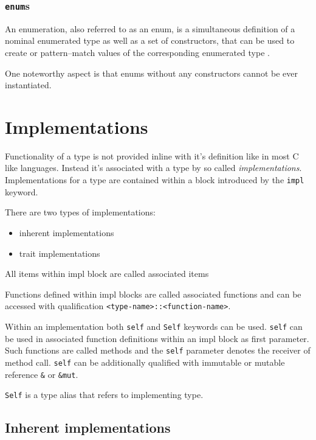 \subsubsection{\texttt{enum}s}

An enumeration, also referred to as an enum, is a simultaneous definition of a nominal enumerated type as well as a set of constructors, 
that can be used to create or pattern--match values of the corresponding enumerated type \cite{rustreference}.

One noteworthy aspect is that enums without any constructors cannot be ever instantiated.

\section{Implementations}

Functionality of a type is not provided inline with it's definition like in most C like languages. 
Instead it's associated with a type by so called \textit{implementations}.
Implementations for a type are contained within a block introduced by the \texttt{impl} keyword.

There are two types of implementations:
\begin{itemize}
    \item inherent implementations
    \item trait implementations
\end{itemize}

All items within impl block are called associated items

Functions defined within impl blocks are called associated functions and can be accessed with qualification \texttt{<type-name>::<function-name>}.

Within an implementation both \texttt{self} and \texttt{Self} keywords can be used.
\texttt{self} can be used in associated function definitions within an impl block as first parameter. 
Such functions are called methods and the \texttt{self} parameter denotes the receiver of method call. 
\texttt{self} can be additionally qualified with immutable or mutable reference \texttt{\&} or \texttt{\&mut}.

\texttt{Self} is a type alias that refers to implementing type.

\subsection{Inherent implementations}

